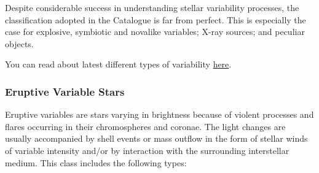Despite considerable success in understanding stellar variability
processes, the classification adopted in the Catalogue is far from
perfect. This is especially the case for explosive, symbiotic and
novalike variables; X-ray sources; and peculiar objects.

You can read about latest different types of variability
\href{http://cdsarc.u-strasbg.fr/vizier/ftp/cats/B/gcvs/vartype.txt}{here}.

\subsubsection{Eruptive Variable Stars}\label{eruptive-variable-stars}

Eruptive variables are stars varying in brightness because of violent
processes and flares occurring in their chromospheres and coronae. The
light changes are usually accompanied by shell events or mass outflow in
the form of stellar winds of variable intensity and/or by interaction
with the surrounding interstellar medium. This class includes the
following types:

